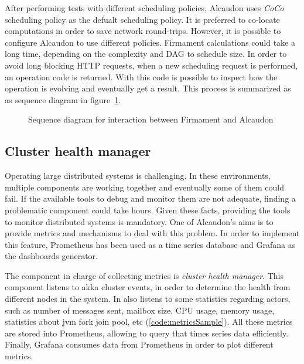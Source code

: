 After performing tests with different scheduling policies, Alcaudon uses
\textit{CoCo} scheduling policy as the defualt scheduling policy. It is
preferred to co-locate computations in order to save network round-trips.
However, it is possible to configure Alcaudon to use different policies.
Firmament calculations could take a long time, depending on the complexity
and \acs{DAG} to schedule size. In order to avoid long blocking \acs{HTTP}
requests, when a new scheduling request is performed, an operation code
is returned. With this code is possible to inspect how the operation is
evolving and eventually get a result. This process is summarized as as
sequence diagram in figure~\ref{fig:schedulefirmament}.

\begin{figure}[!h]
  \centering
  \scalebox{0.5}{
    
  }
\caption{Sequence diagram for interaction between Firmament and Alcaudon}
\label{fig:schedulefirmament}
\end{figure}


\subsection{Cluster health manager}

Operating large distributed systems is challenging. In these environments,
multiple components are working together and eventually some of them could fail.
If the available tools to debug and monitor them are not adequate, finding a
problematic component could take hours. Given these facts, providing the tools
to monitor distributed systems is mandatory. One of Alcaudon's aims is to
provide metrics and mechanisms to deal with this problem. In order to implement
this feature, Prometheus has been used as a time series database and Grafana
as the dashboards generator. 

The component in charge of collecting metrics is \textit{cluster health
  manager}. This component listens to akka cluster events, in order to determine
the health from different nodes in the system. In also listens to some statistics
regarding actors, such as number of messages sent, mailbox size, CPU usage,
memory usage, statistics about jvm fork join pool,
etc (\ref{code:metricsSample}). All these metrics are stored into Prometheus,
allowing to query that times series data efficiently. Finally, Grafana consumes
data from Prometheus in order to plot different metrics.

